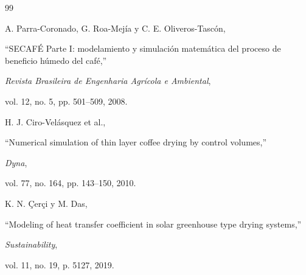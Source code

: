 \documentclass[conference]{IEEEtran}
\begin{document}
\begin{thebibliography}{99}


A. Parra-Coronado,
G. Roa-Mejía
y
C. E. Oliveros-Tascón,

``SECAFÉ Parte I: modelamiento y simulación matemática del proceso de beneficio húmedo del café,''

\textit{Revista Brasileira de Engenharia Agrícola e Ambiental},

vol. 12, no. 5, pp. 501--509,
2008.


H. J. Ciro-Velásquez et al.,

``Numerical simulation of thin layer coffee drying by control volumes,''

\textit{Dyna},

vol. 77, no. 164, pp. 143--150,
2010.


K. N. Çerçi y M. Das,

``Modeling of heat transfer coefficient in solar greenhouse type drying systems,''

\textit{Sustainability},

vol. 11, no. 19, p. 5127,
2019.

\end{thebibliography}
\end{document}
